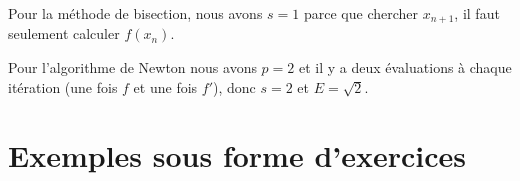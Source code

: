 \begin{example}[Bisection]
    Pour la méthode de bisection, nous avons \( s=1\) parce que chercher \( x_{n+1}\), il faut seulement calculer \( f(x_n)\).
\end{example}

\begin{example}[Newton]
    Pour l'algorithme de Newton nous avons \( p=2\) et il y a deux évaluations à chaque itération (une fois \( f\) et une fois \( f'\)), donc \( s=2\) et \( E=\sqrt{ 2 }\).
\end{example}

\section{Exemples sous forme d'exercices}

